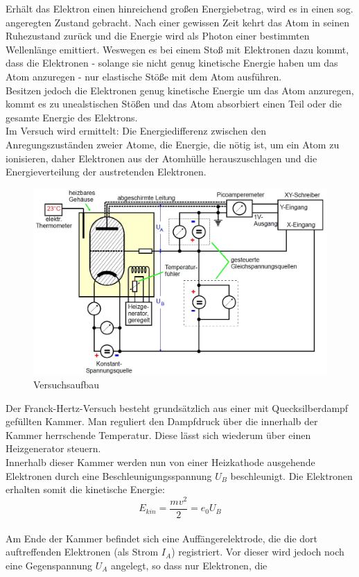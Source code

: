 Erhält das Elektron einen hinreichend großen Energiebetrag, wird es in einen sog. angeregten Zustand gebracht. Nach einer gewissen Zeit kehrt das Atom in seinen Ruhezustand zurück und die Energie wird als Photon einer bestimmten Wellenlänge emittiert.
Weswegen es bei einem Stoß mit Elektronen dazu kommt, dass die Elektronen - solange sie nicht genug kinetische Energie haben um das Atom anzuregen - nur elastische Stöße mit dem Atom ausführen.\\
Besitzen jedoch die Elektronen genug kinetische Energie um das Atom anzuregen, kommt es zu unealstischen Stößen und das Atom absorbiert einen Teil oder die gesamte Energie des Elektrons.\\

Im Versuch wird ermittelt: Die Energiedifferenz zwischen den Anregungszuständen zweier Atome, die Energie, die nötig ist, um ein Atom zu ionisieren, daher Elektronen aus der Atomhülle herauszuschlagen und die Energieverteilung der austretenden Elektronen.

\begin{figure}[h]
	\centering
	\includegraphics[scale = 0.45]{Grafiken/V601_Abb1.jpg}
	\caption{Versuchsaufbau\cite{V601}}
\end{figure}

Der Franck-Hertz-Versuch besteht grundsätzlich aus einer mit Quecksilberdampf gefüllten Kammer. Man reguliert den Dampfdruck über die innerhalb der Kammer herrschende Temperatur. Diese lässt sich wiederum über einen Heizgenerator steuern.\\
Innerhalb dieser Kammer werden nun von einer Heizkathode ausgehende Elektronen durch eine Beschleunigungsspannung $U_B$ beschleunigt. Die Elektronen erhalten somit die kinetische Energie:
\begin{equation}
E_{kin} = \frac{mv^2}{2} = e_0 U_B
\end{equation}
\\
Am Ende der Kammer befindet sich eine Auffängerelektrode, die die dort auftreffenden Elektronen (als Strom $I_A$) registriert. Vor dieser wird jedoch noch eine Gegenspannung $U_A$ angelegt, so dass nur Elektronen, die

